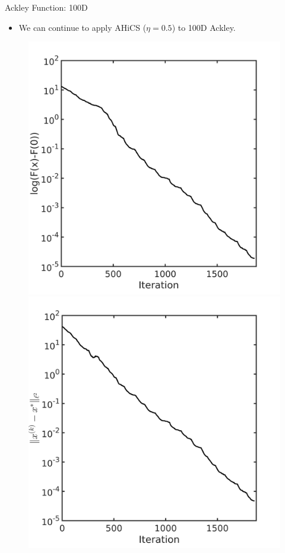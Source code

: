 \documentclass{beamer}
\begin{document}
\begin{frame}{Ackley Function: 100D}
	\begin{itemize}
		\item We can continue to apply AHiCS ($\eta=0.5$) to 100D Ackley.
	\end{itemize}
\begin{figure}[!htbp]
	\centering
	  \includegraphics[scale=0.25]{./figures/ackley100D.png}
	  \includegraphics[scale=0.25]{./figures/ackley100D_dist.png}
\end{figure}
\end{frame}
\end{document}
